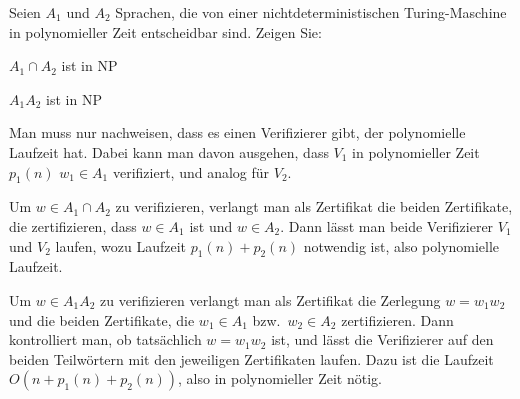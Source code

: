 Seien $A_1$ und $A_2$ Sprachen, die von einer nichtdeterministischen
Turing-Maschine in polynomieller Zeit entscheidbar sind. Zeigen Sie:
\begin{teilaufgaben}
\item $A_1\cap A_2$ ist in NP
\item $A_1A_2$ ist in NP
\end{teilaufgaben}


\begin{loesung}
Man muss nur nachweisen, dass es einen Verifizierer gibt, der polynomielle
Laufzeit hat. Dabei kann man davon ausgehen, dass $V_1$ in polynomieller
Zeit $p_1(n)$ $w_1\in A_1$ verifiziert, und analog für $V_2$.
\begin{teilaufgaben}
\item
Um $w\in A_1\cap A_2$ zu verifizieren, verlangt man als Zertifikat
die beiden Zertifikate, die zertifizieren, dass $w\in  A_1$
ist und $w\in A_2$. Dann lässt man beide Verifizierer
$V_1$ und $V_2$ laufen, wozu Laufzeit $p_1(n)+p_2(n)$ notwendig ist,
also polynomielle Laufzeit.
\item
Um $w\in A_1A_2$ zu verifizieren verlangt man als Zertifikat
die Zerlegung $w=w_1w_2$ und die beiden Zertifikate, die 
$w_1\in A_1$ bzw.~$w_2\in A_2$ zertifizieren. Dann kontrolliert
man, ob tatsächlich $w=w_1w_2$ ist, und  lässt
die Verifizierer auf den beiden Teilwörtern mit den
jeweiligen Zertifikaten laufen.
Dazu ist die Laufzeit
$O(n + p_1(n) + p_2(n))$, also in polynomieller Zeit nötig.
\qedhere
\end{teilaufgaben}
\end{loesung}
